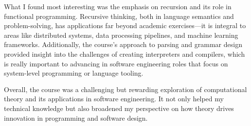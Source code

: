 \documentclass{article}
\begin{document}
What I found most interesting was the emphasis on recursion and its role in functional programming. Recursive thinking, both in language semantics and problem-solving, has applications far beyond academic exercises—it is integral to areas like distributed systems, data processing pipelines, and machine learning frameworks. Additionally, the course's approach to parsing and grammar design provided insight into the challenges of creating interpreters and compilers, which is really important to advancing in software engineering roles that focus on system-level programming or language tooling.

Overall, the course was a challenging but rewarding exploration of computational theory and its applications in software engineering. It not only helped my technical knowledge but also broadened my perspective on how theory drives innovation in programming and software design.
\end{document}
